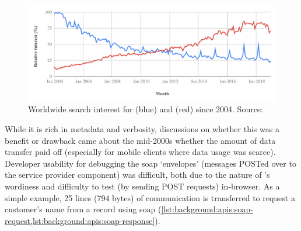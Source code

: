 \begin{figure}[h!]
  \centering
  \includegraphics[width=\linewidth]{rest-vs-soap}
  \caption[SOAP versus REST search interest over time]{Worldwide search interest for  (blue) and  (red) since 2004. Source:~}
  \label{fig:background:apis:rest-vs-soap}
\end{figure}

While it is rich in metadata and verbosity, discussions on whether this was a benefit or drawback came about the mid-2000s \citep{zurMuehlen:2005ci,Pautasso:2008uw} whether the amount of data transfer paid off (especially for mobile clients where data usage was scarce). Developer usability for debugging the \gls{soap} `envelopes' (messages POSTed over  to the service provider component) was difficult, both due to the nature of 's wordiness and difficulty to test (by sending POST requests) in-browser. As a simple example, 25 lines (794 bytes) of  communication is transferred to request a customer's name from a record using \gls{soap} (\cref{lst:background:apis:soap-request,lst:background:apis:soap-response}). 

